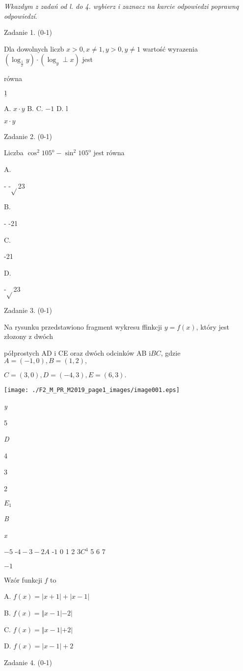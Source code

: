 \documentclass[a4paper,12pt]{article}
\begin{document}
{\it Wkazdym z zadań od l. do 4. wybierz i zaznacz na karcie odpowiedzi poprawnq odpowiedzí}.

Zadanie 1. (0-1)

Dla dowolnych liczb $x>0, x\neq 1, y>0, y\neq 1$ wartość wyrazenia $(\log_{\frac{1}{x}}y)\cdot(\log_{y}\perp x)$ jest

równa

$\underline{1}$

A. $x\cdot y$ B. C. $-1$ D. l

$x\cdot y$

Zadanie 2. (0-1)

Liczba $\cos^{2}105^{\mathrm{o}}-\sin^{2}105^{\mathrm{o}}$ jest równa

A.

- -$\sqrt{}$23

B.

- -21

C.

-21

D.

-$\sqrt{}$23

Zadanie 3. (0-1)

Na rysunku przedstawiono fragment wykresu ffinkcji $y=f(x)$, który jest złozony z dwóch

półprostych AD $\mathrm{i}$ CE oraz dwóch odcinków AB $\mathrm{i} BC$, gdzie $A=(-1,0), B=(1,2),$

$C=(3,0), D=(-4,3), E=(6,3).$
\begin{center}
\texttt{[image: ./F2\_M\_PR\_M2019\_page1\_images/image001.eps]}
\end{center}
{\it y}

5

{\it D}

4

3

2

$E_{1}$

{\it B}

{\it x}

$-5$ -$4  -3  -2A$ -$1$  0  1 2  $3C^{4}$  5 6  7

$-1$

Wzór funkcji $f$ to

A. $f(x)=|x+1|+|x-1|$

B. $f(x)=\Vert x-1|-2|$

C. $f(x)=\Vert x-1|+2|$

D. $f(x)=|x-1|+2$

Zadanie 4. (0-1)
\end{document}
